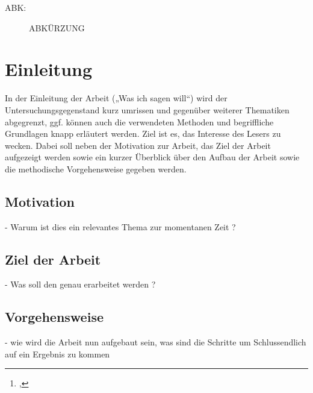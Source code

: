 \documentclass[12pt,toc=bib,toc=listof]{scrreprt}
\title{\ebttopic}
\author{\ebtstudentname\footnote{\ebtstudentid, \ebtstudentmail}}
\begin{document}
\maketitle
\tableofcontents

\label{sec:abkuerzungsverzeichnis}

\begin{description}
  \item[ABK:] ABKÜRZUNG 
\end{description}


\listoffigures
\listoftables

\onehalfspacing
\newpage
{}

\chapter{Einleitung} %
\label{sec:einleitung}
In der Einleitung der Arbeit („Was ich sagen will“) wird der Untersuchungsgegenstand
kurz umrissen und gegenüber weiterer Thematiken abgegrenzt, ggf. können auch die
verwendeten Methoden und begriffliche Grundlagen knapp erläutert werden. Ziel ist
es, das Interesse des Lesers zu wecken. Dabei soll neben der Motivation zur Arbeit,
das Ziel der Arbeit aufgezeigt werden sowie ein kurzer Überblick über den Aufbau der
Arbeit sowie die methodische Vorgehensweise gegeben werden.

\section{Motivation} %
\label{sec:motivation}
- Warum ist dies ein relevantes Thema zur momentanen Zeit ?


\section{Ziel der Arbeit} %
\label{sec:ziel_der_arbeit}
- Was soll den genau erarbeitet werden ?



\section{Vorgehensweise} %
\label{sec:vorgehensweise}
- wie wird die Arbeit nun aufgebaut sein, was sind die Schritte um Schlussendlich auf ein Ergebnis zu kommen
\end{document}
